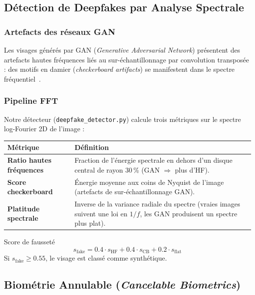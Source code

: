 \documentclass[12pt,a4paper]{article}
\begin{document}
\subsection{Détection de Deepfakes par Analyse Spectrale}

\subsubsection{Artefacts des réseaux GAN}

Les visages générés par GAN (\textit{Generative Adversarial Network}) présentent
des artefacts hautes fréquences liés au sur-échantillonnage par convolution
transposée : des motifs en damier (\textit{checkerboard artifacts}) se
manifestent dans le spectre fréquentiel~\cite{li2021}.

\subsubsection{Pipeline FFT}

Notre détecteur (\texttt{deepfake\_detector.py}) calcule trois métriques sur
le spectre log-Fourier 2D de l'image :

\begin{longtable}{>{\bfseries}p{4.5cm} p{9cm}}
\toprule
Métrique & Définition \\
\midrule
\endhead
\bottomrule
\endfoot
Ratio hautes fréquences & Fraction de l'énergie spectrale en dehors d'un
                          disque central de rayon 30\,\% (GAN $\Rightarrow$
                          plus d'HF). \\[4pt]
Score checkerboard & Énergie moyenne aux coins de Nyquist de l'image
                     (artefacts de sur-échantillonnage GAN). \\[4pt]
Platitude spectrale & Inverse de la variance radiale du spectre
                      (vraies images suivent une loi en $1/f$,
                       les GAN produisent un spectre plus plat). \\
\end{longtable}

\begin{formulebox}{Score de fausseté}
\[
  s_{\text{fake}} = 0.4 \cdot s_{\text{HF}} + 0.4 \cdot s_{\text{CB}} +
                    0.2 \cdot s_{\text{flat}}
\]
Si $s_{\text{fake}} \geq 0.55$, le visage est classé comme synthétique.
\end{formulebox}

\subsection{Biométrie Annulable (\textit{Cancelable Biometrics})}
\end{document}
